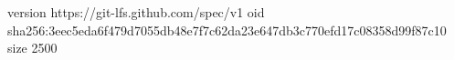 version https://git-lfs.github.com/spec/v1
oid sha256:3eec5eda6f479d7055db48e7f7c62da23e647db3c770efd17c08358d99f87c10
size 2500
